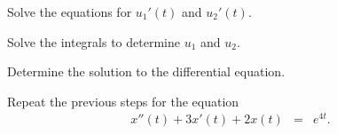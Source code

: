 \begin{problem}
\begin{subproblem}
    \vfill

  \item Solve the equations for $u_1'(t)$ and $u_2'(t)$.

    \vfill

    \clearpage

  \item Solve the integrals to determine $u_1$ and $u_2$.

    \vfill

  \item Determine the solution to the differential equation.

    \vfill


  \end{subproblem}

  \clearpage

\item Repeat the previous steps for the equation
  \begin{eqnarray}
    x''(t) + 3x'(t) + 2x(t) & = & e^{4t}.
  \end{eqnarray}


\end{problem}


